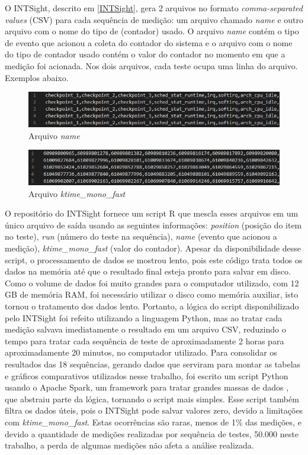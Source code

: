 O INTSight, descrito em \ref{INTSight}, gera 2 arquivos no formato \textit{comma-separated values} (CSV) para cada sequência de medição: um arquivo chamado \textit{name} e outro arquivo com o nome do tipo de (contador) usado. O arquivo \textit{name} contém o tipo de evento que acionou a coleta do contador do sistema e o arquivo com o nome do tipo de contador usado contém o valor do contador no momento em que a medição foi acionada. Nos dois arquivos, cada teste ocupa uma linha do arquivo. Exemplos abaixo.

\begin{figure}[!htb]
    \centering
    \includegraphics[width=\textwidth]{photos/name.png}
    \caption{Arquivo \textit{name}}
    \label{grafico:softirq}
\end{figure}

\begin{figure}[!htb]
    \centering
    \includegraphics[width=\textwidth]{photos/ktime.png}
    \caption{Arquivo \textit{ktime\_mono\_fast}}
    \label{grafico:softirq}
\end{figure}


O repositório do INTSight fornece um script R que mescla esses arquivos em um único arquivo de saída usando as seguintes informações: \textit{position} (posição do item no teste), \textit{run} (número do teste na sequência), \textit{name} (evento que acionou a medição), \textit{ktime\_mono\_fast} (valor do contador). Apesar da disponibilidade desse script, o processamento de dados se mostrou lento, pois este código trata todos os dados na memória até que o resultado final esteja pronto para salvar em disco. Como o volume de dados foi muito grandes para o computador utilizado, com 12 GB de memória RAM, foi necessário utilizar o disco como memória auxiliar, isto tornou o tratamento dos dados lento. Portanto, a lógica do script disponibilizado pelo INTSight foi refeito utilizando a linguagem Python, mas ao tratar cada medição salvava imediatamente o resultado em um arquivo CSV, reduzindo o tempo para tratar cada sequência de teste de aproximadamente 2 horas para aproximadamente 20 minutos, no computador utilizado. Para consolidar os resultados das 18 sequências, gerando dados que serviram para montar as tabelas e gráficos comparativos utilizados nesse trabalho, foi escrito um script Python usando o Apache Spark, um framework para tratar grandes massas de dados \cite{Spark2009}, que abstraiu parte da lógica, tornando o script mais simples. Esse script também filtra os dados úteis, pois o INTSight pode salvar valores zero, devido a limitações com \textit{ktime\_mono\_fast}. Estas ocorrências são raras, menos de 1\% das medições, e devido a quantidade de medições realizadas por sequência de testes, 50.000 neste trabalho, a perda de algumas medições não afeta a análise realizada. 

